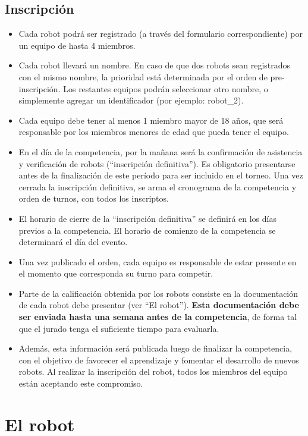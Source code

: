 \documentclass[a4paper,11pt]{article}
\begin{document}
\subsection*{Inscripción}
\begin{itemize}
  \item Cada robot podrá ser registrado (a través del formulario correspondiente) por un equipo de hasta 4 miembros.
  \item Cada robot llevará un nombre. En caso de que dos robots sean registrados con el mismo nombre, la prioridad está determinada por el orden de pre-inscripción. Los restantes equipos podrán seleccionar otro nombre, o simplemente agregar un identificador (por ejemplo: robot\_2).
  \item Cada equipo debe tener al menos 1 miembro mayor de 18 años, que será responsable por los miembros menores de edad que pueda tener el equipo.
  \item En el día de la competencia, por la mañana será la confirmación de asistencia y verificación de robots (``inscripción definitiva''). Es obligatorio presentarse antes de la finalización de este período para ser incluido en el torneo. Una vez cerrada la inscripción definitiva, se arma el cronograma de la competencia y orden de turnos, con todos los inscriptos.
  \item El horario de cierre de la ``inscripción definitiva'' se definirá en los días previos a la competencia. El horario de comienzo de la competencia se determinará el día del evento.
  \item Una vez publicado el orden, cada equipo es responsable de estar presente en el momento que corresponda su turno para competir.
  \item Parte de la calificación obtenida por los robots consiste en la documentación de cada robot debe presentar (ver ``El robot''). \textbf{Esta documentación debe ser enviada hasta una semana antes de la competencia}, de forma tal que el jurado tenga el suficiente tiempo para evaluarla.
  \item Además, esta información será publicada luego de finalizar la competencia, con el objetivo de favorecer el aprendizaje y fomentar el desarrollo de nuevos robots. Al realizar la inscripción del robot, todos los miembros del equipo están aceptando este compromiso.
\end{itemize}


\section*{El robot}
\end{document}
